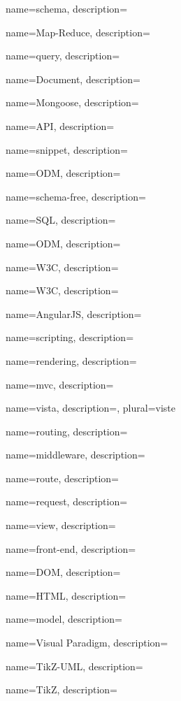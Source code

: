  {
	name=schema,
	description={\TODO{}}
}

 {
	name=Map-Reduce,
	description={\TODO{}}
}

 {
	name=query,
	description={\TODO{}}
}

 {
	name=Document,
	description={\TODO{}}
}

 {
	name=Mongoose,
	description={\TODO{}}
}

 {
	name=API,
	description={\TODO{}}
}

 {
	name=snippet,
	description={\TODO{}}
}

 {
	name=ODM,
	description={\TODO{}}
}

 {
	name=schema-free,
	description={\TODO{}}
}

 {
	name=SQL,
	description={\TODO{}}
}

 {
	name=ODM,
	description={\TODO{}}
}

 {
	name=W3C,
	description={\TODO{}}
}

 {
	name=W3C,
	description={\TODO{}}
}

 {
	name=AngularJS,
	description={\TODO{}}
}

 {
	name=scripting,
	description={\TODO{}}
}

 {
	name=rendering,
	description={\TODO{}}
}

 {
	name=mvc,
	description={\TODO{}}
}

 {
	name=vista,
	description={\TODO{}},
	plural=viste
}

 {
	name=routing,
	description={\TODO{}}
}

 {
	name=middleware,
	description={\TODO{}}
}

 {
	name=route,
	description={\TODO{}}
}

 {
	name=request,
	description={\TODO{}}
}

 {
	name=view,
	description={\TODO{}}
}

 {
	name=front-end,
	description={\TODO{}}
}

 {
	name=DOM,
	description={\TODO{}}
}

 {
	name=HTML,
	description={\TODO{}}
}

 {
	name=model,
	description={\TODO{}}
}

 {
	name=Visual Paradigm,
	description={\TODO{}}
}

 {
	name=TikZ-UML,
	description={\TODO{}}
}

 {
	name=TikZ,
	description={\TODO{}}
}
